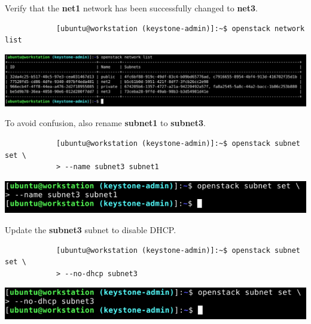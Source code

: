 \documentclass[letterpaper, 12pt]{article}
\begin{document}
\begin{enumerate}
    \begin{labstep}
        Verify that the \textbf{net1} network has been successfully changed to \textbf{net3}.
        \begin{lstlisting}
            [ubuntu@workstation (keystone-admin)]:~$ openstack network list
        \end{lstlisting}

        \begin{center}
            \includegraphics[width=\linewidth]{images/part3/step18.png}
        \end{center}
    \end{labstep}

    \begin{labstep}
        To avoid confusion, also rename \textbf{subnet1} to \textbf{subnet3}.
        \begin{lstlisting}
            [ubuntu@workstation (keystone-admin)]:~$ openstack subnet set \
            > --name subnet3 subnet1
        \end{lstlisting}

        \begin{center}
            \includegraphics[width=\linewidth]{images/part3/step19.png}
        \end{center}
    \end{labstep}

    \begin{labstep}
        Update the \textbf{subnet3} subnet to disable DHCP.
        \begin{lstlisting}
            [ubuntu@workstation (keystone-admin)]:~$ openstack subnet set \
            > --no-dhcp subnet3
        \end{lstlisting}

        \begin{center}
            \includegraphics[width=\linewidth]{images/part3/step21.png}
        \end{center}
    \end{labstep}


\end{enumerate}
\end{document}
